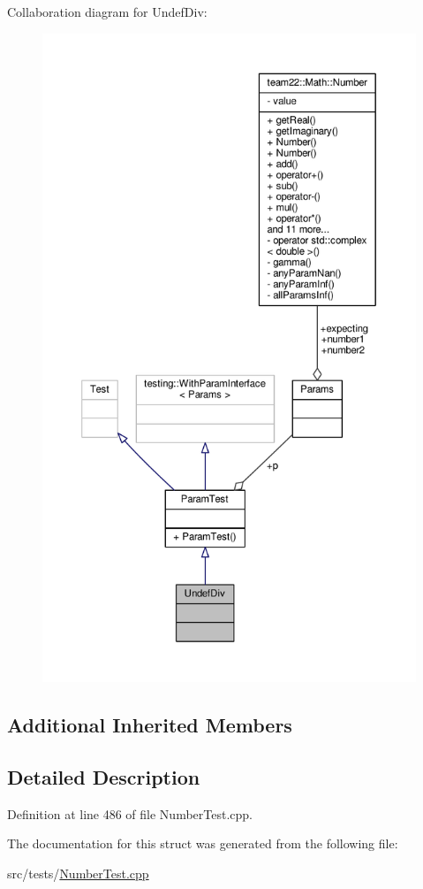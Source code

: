 Collaboration diagram for Undef\+Div\+:
\nopagebreak
\begin{figure}[H]
\begin{center}
\leavevmode
\includegraphics[height=550pt]{struct_undef_div__coll__graph}
\end{center}
\end{figure}
\subsection*{Additional Inherited Members}


\subsection{Detailed Description}


Definition at line 486 of file Number\+Test.\+cpp.



The documentation for this struct was generated from the following file\+:\begin{DoxyCompactItemize}
\item 
src/tests/\hyperlink{_number_test_8cpp}{Number\+Test.\+cpp}\end{DoxyCompactItemize}
